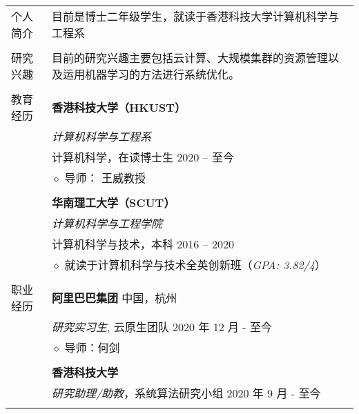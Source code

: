 \documentclass[letterpaper, 11pt]{article}
\begin{document}
\begin{longtable}{p{1.3in}p{4.8in}}

{个人简介}
& 目前是博士二年级学生，就读于香港科技大学计算机科学与工程系 \\
& \\

\nohyphens{研究兴趣}
& 目前的研究兴趣主要包括云计算、大规模集群的资源管理以及运用机器学习的方法进行系统优化。 \\
& \\

{教育经历}
& \textbf{香港科技大学（HKUST）} \\
& \textit{计算机科学与工程系} \\
& 计算机科学，在读博士生 \hfill 2020 -- 至今 \\
& $\diamond$ 导师： 王威教授 \\
& \\

& \textbf{华南理工大学（SCUT）} \\
& \textit{计算机科学与工程学院} \\
& 计算机科学与技术，本科 \hfill 2016 -- 2020 \\
& $\diamond$ 就读于计算机科学与技术全英创新班（{\it GPA: 3.82/4}） \\
& \\


{职业经历}
& {\textbf{阿里巴巴集团}} \hfill 中国，杭州 \\
& \textit{研究实习生}, 云原生团队 \hfill 2020 年 12 月 - 至今 \\
& $\diamond$ 导师：何剑 \\
& \\

& {\textbf{香港科技大学}} \\
& \textit{研究助理/助教}，系统算法研究小组 \hfill 2020 年 9 月 - 至今 \\
& \\
 

\end{longtable}
\end{document}
